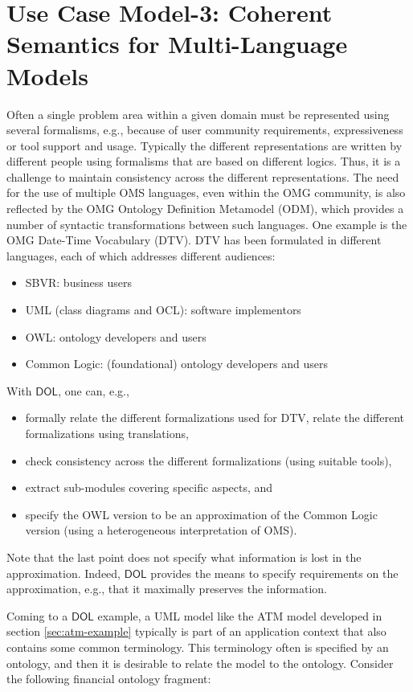 \documentclass[10pt,fleqn,final]{scrreprt}
\newcommand*{\DOL}{\ensuremath{\mathsf{DOL}}\xspace}
\newenvironment{definitions}[0]{\medskip }{}
\begin{document}
\begin{definitions}
\section{Use Case Model-3: Coherent Semantics for Multi-Language Models}
\label{model-3}
	
Often a single problem area within a given domain must be represented using several formalisms, e.g., because of user community requirements, expressiveness or tool support 
and usage. 
Typically the different representations are written by different people using formalisms that are based on different logics. Thus, it is a challenge to maintain 
consistency across the different representations. 
The need for the use of multiple OMS languages, even within the OMG community, is also reflected by the OMG Ontology Definition Metamodel (ODM), which 
provides a number of syntactic transformations between such languages.
One example is the OMG Date-Time Vocabulary (DTV). DTV has been formulated in different languages, each of which addresses different audiences:
\begin{itemize}
\item	 SBVR: business users
\item 	UML (class diagrams and OCL): software implementors
\item 	OWL: ontology developers and users
\item 	Common Logic: (foundational) ontology developers and users
\end{itemize}
With \DOL, one can, e.g.,
\begin{itemize}
\item 	formally relate the different formalizations used for DTV, relate the different formalizations using translations,
\item 	check consistency across the different formalizations (using suitable tools),
\item 	extract sub-modules covering specific aspects, and
\item 	specify the OWL version to be an approximation of the Common Logic version (using a heterogeneous interpretation of OMS).
\end{itemize}
Note that the last point does not specify what information is lost in the approximation. Indeed, \DOL provides the means to specify requirements on the approximation, e.g., that it maximally preserves the information. 

Coming to a \DOL example,
a UML model like the ATM model developed in section \ref{sec:atm-example} typically is part of an
application context that also contains some common terminology.
This terminology often is specified by an ontology, and then
it is desirable to relate the model to the ontology. Consider
the following financial ontology fragment:


\end{definitions}
\end{document}
